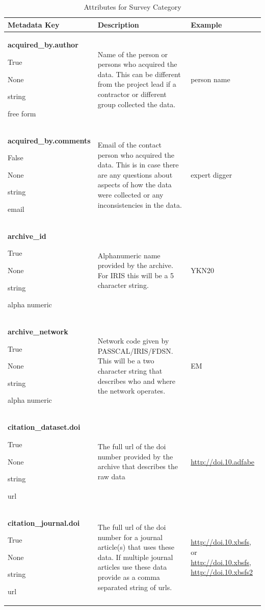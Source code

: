 \documentclass[12pt]{article}
\newcommand{\entry}[7]{
	\textbf{#1} 
	\begin{itemize}[topsep=5pt,itemsep=-.1pt,parsep=-2pt,partopsep=0pt,labelwidth=2em,align=left,itemindent=1em]
		\begin{small}
			\item[Required:] #2
			\item[Units:] #3
			\item[Type:] #4
			\item[Style:] #5
		\end{small}
	\end{itemize} & #6 & #7 \\ \midrule}
\begin{document}
\begin{table}[h!]
	\caption[Attributes for Survey]{Attributes for Survey Category}
	\begin{tabular}{p{}p{}p{}}
	\textbf{Metadata Key} & \textbf{Description} & \textbf{Example} \\ \toprule
	\entry{acquired\_by.author}{True}{None}{string}{free form}{Name of the person or persons who acquired the data.  This can be different from the project lead if a contractor or different group collected the data.}{person name}
	\entry{acquired\_by.comments}{False}{None}{string}{email}{Email of the contact person who acquired the data. This is in case there are any questions about aspects of how the data were collected or any inconsistencies in the data.}{expert digger}
	\entry{archive\_id}{True}{None}{string}{alpha numeric}{Alphanumeric name provided by the archive.  For IRIS this will be a 5 character string.}{YKN20}
	\entry{archive\_network}{True}{None}{string}{alpha numeric}{Network code given by PASSCAL/IRIS/FDSN.  This will be a two character string that describes who and where the network operates.}{EM}
	\entry{citation\_dataset.doi}{True}{None}{string}{url}{The full url of the doi number provided by the archive that describes the raw data}{\url{http://doi.10.adfabe}}
	\entry{citation\_journal.doi}{True}{None}{string}{url}{The full url of the doi number for a journal article(s) that uses these data.  If multiple journal articles use these data provide as a comma separated string of urls. }{\url{http://doi.10.xbsfs}, or \url{http://doi.10.xbsfs}, \url{http://doi.10.xbsfs2}}
	\end{tabular}
	\label{tab:survey}
\end{table} 

\clearpage
\newpage
\end{document}
